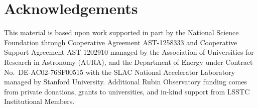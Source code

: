 \documentclass[11pt,twoside]{article}
\begin{document}
\section*{Acknowledgements}

This material is based upon work
supported in part by the National Science Foundation through Cooperative
Agreement AST-1258333 and Cooperative Support Agreement AST-1202910
managed by the Association of Universities for Research in Astronomy
(AURA), and the Department of Energy under Contract No.\ DE-AC02-76SF00515
with the SLAC National Accelerator Laboratory managed by Stanford
University. Additional Rubin Observatory funding comes from private
donations, grants to universities, and in-kind support from LSSTC
Institutional Members.





\end{document}
